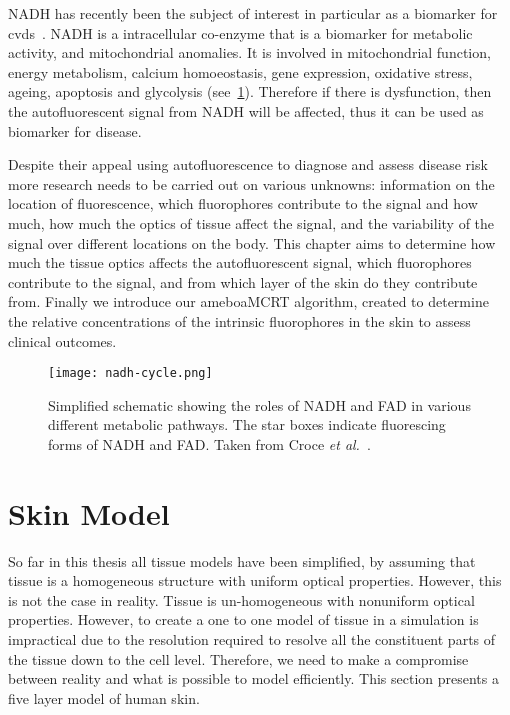 NADH has recently been the subject of interest in particular as a biomarker for \gls*{cvds}~\cite{akbar2014vivo,elahi2009oxidative,blacker2016investigating}.
NADH is a intracellular co-enzyme that is a biomarker for metabolic activity, and mitochondrial anomalies. 
It is involved in mitochondrial function, energy metabolism, calcium homoeostasis, gene expression, oxidative stress, ageing, apoptosis and glycolysis (see~\cref{fig:nadhfadpath}).
Therefore if there is dysfunction, then the autofluorescent signal from NADH will be affected, thus it can be used as biomarker for disease.

Despite their appeal using autofluorescence to diagnose and assess disease risk more research needs to be carried out on various unknowns: information on the location of fluorescence, which fluorophores contribute to the signal and how much, how much the optics of tissue affect the signal, and the variability of the signal over different locations on the body.
This chapter aims to determine how much the tissue optics affects the autofluorescent signal, which fluorophores contribute to the signal, and from which layer of the skin do they contribute from.
Finally we introduce our ameboaMCRT algorithm, created to determine the relative concentrations of the intrinsic fluorophores in the skin to assess clinical outcomes.


\begin{figure}[!htpb]
  \centering
  \texttt{[image: nadh-cycle.png]}
  \caption{Simplified schematic showing the roles of NADH and FAD in various different metabolic pathways. The star boxes indicate fluorescing forms of NADH and FAD. Taken from Croce \textit{et al.}~\cite{croce2014autofluorescence}.}
  \label{fig:nadhfadpath}
\end{figure}


\FloatBarrier

\section{Skin Model}

So far in this thesis all tissue models have been simplified, by assuming that tissue is a homogeneous structure with uniform optical properties.
However, this is not the case in reality.
Tissue is un-homogeneous with nonuniform optical properties.
However, to create a one to one model of tissue in a simulation is impractical due to the resolution required to resolve all the constituent parts of the tissue down to the cell level.
Therefore, we need to make a compromise between reality and what is possible to model efficiently.
This section presents a five layer model of human skin. 

